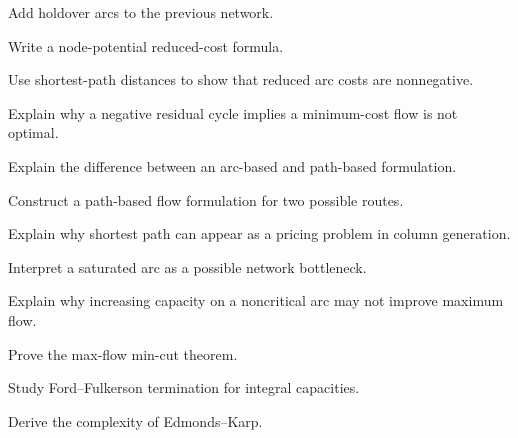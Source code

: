\begin{exercise}[3]
Add holdover arcs to the previous network.
\end{exercise}

\begin{exercise}[3]
Write a node-potential reduced-cost formula.
\end{exercise}

\begin{exercise}[3]
Use shortest-path distances to show that reduced arc costs are
nonnegative.
\end{exercise}

\begin{exercise}[3]
Explain why a negative residual cycle implies a minimum-cost flow is not
optimal.
\end{exercise}

\begin{exercise}[3]
Explain the difference between an arc-based and path-based formulation.
\end{exercise}

\begin{exercise}[3]
Construct a path-based flow formulation for two possible routes.
\end{exercise}

\begin{exercise}[3]
Explain why shortest path can appear as a pricing problem in column
generation.
\end{exercise}

\begin{exercise}[3]
Interpret a saturated arc as a possible network bottleneck.
\end{exercise}

\begin{exercise}[3]
Explain why increasing capacity on a noncritical arc may not improve
maximum flow.
\end{exercise}

\begin{exercise}[4]
Prove the max-flow min-cut theorem.
\end{exercise}

\begin{exercise}[4]
Study Ford--Fulkerson termination for integral capacities.
\end{exercise}

\begin{exercise}[4]
Derive the complexity of Edmonds--Karp.
\end{exercise}

